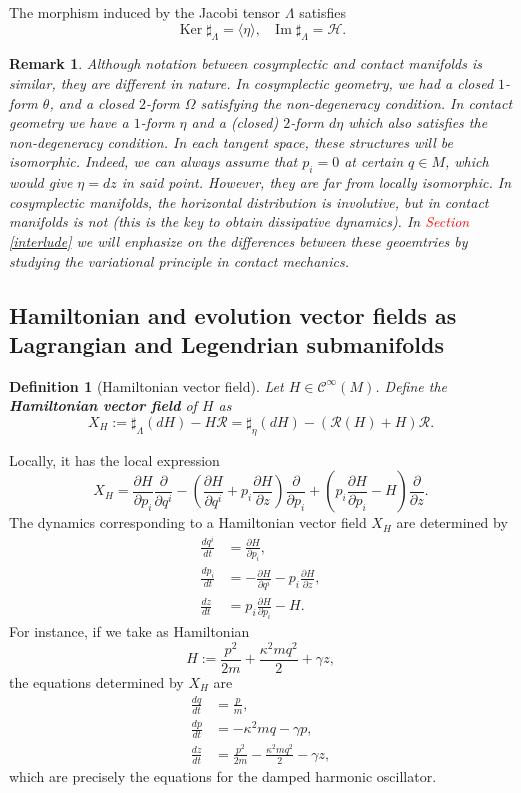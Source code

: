 \documentclass[12pt]{article}
\newtheorem{Def}{Definition}[section]
\newtheorem{remark}{Remark}[section]
\renewcommand{\ker}{\operatorname{Ker}}
\newcommand{\im}{\operatorname{Im}}
\newcommand{\partder}[2]{\frac{\partial #1}{\partial #2}}
\newcommand{\totder}[2]{\frac{d #1}{d #2}}
\begin{document}
The morphism induced by the Jacobi tensor $\Lambda$ satisfies $$\ker \sharp_\Lambda = \langle  \eta\rangle, \,\,\,\, \im \sharp_\Lambda = \mathcal{H}.$$

\begin{remark}{\rm Although notation between cosymplectic and contact manifolds is similar, they are different in nature. In cosymplectic geometry, we had a closed $1$-form $\theta$, and a closed $2$-form $\Omega$ satisfying the non-degeneracy condition. In contact geometry we have a $1$-form $\eta$ and a (closed) $2$-form $d \eta$ which also satisfies the non-degeneracy condition. In each tangent space, these structures will be isomorphic. Indeed, we can always assume that $p_i = 0$ at certain $q \in M$, which would give $\eta = dz$ in said point. However, they are far from locally isomorphic. In cosymplectic manifolds, the horizontal distribution is involutive, but in contact manifolds is not (this is the key to obtain dissipative dynamics). In \textcolor{red}{Section \ref{interlude}} we will enphasize on the differences between these geoemtries by studying the variational principle in contact mechanics.}
\end{remark}

\subsection[Hamiltonian vector fields as Lagrangian submanifolds]{Hamiltonian and evolution vector fields as Lagrangian and Legendrian submanifolds}
\begin{Def}[Hamiltonian vector field] Let $H \in \mathcal{C}^\infty(M)$. Define the \textbf{Hamiltonian vector field} of $H$ as $$X_H := \sharp_ \Lambda(dH) - H \mathcal{R} = \sharp_\eta(dH) - (\mathcal{R}(H) + H)\mathcal{R}.$$
\end{Def}
Locally, it has the local expression 
$$X_H = \partder{H}{p_i} \partder{}{q^i} - \left (\partder{H}{q^i} + p_i\partder{H}{z} \right) \partder{}{p_i} + \left( p_i \partder{H}{p_i} - H\right ) \partder{}{z}.$$ The dynamics corresponding to a Hamiltonian vector field $X_H$ are determined by
\begin{align*}
\totder{q^i}{t} &= \partder{H}{p_i},\\
\totder{p_i}{t} &= - \partder{H}{q^i} - p_i \partder{H}{z},\\
\totder{z}{t} &= p_i \partder{H}{p_i} - H.
\end{align*}
For instance, if we take as Hamiltonian $$H := \frac{p^2}{2m} + \frac{\kappa^2 m q^2}{2} + \gamma z,$$ the equations determined by $X_H$ are 
\begin{align*}
    \totder{q}{t} &= \frac{p}{m},\\
    \totder{p}{t} &=  - \kappa^2 m q - \gamma p,\\
    \totder{z}{t} &= \frac{p^2}{2m} - \frac{\kappa^2 m q^2}{2} - \gamma z,
\end{align*}
which are precisely the equations for the damped harmonic oscillator.\\
\end{document}
